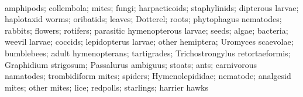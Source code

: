 \fullhline
\hline
{} \\
\hline
amphipods; collembola; mites; fungi; harpacticoids; staphylinids; dipterous larvae; haplotaxid worms; oribatids; leaves; Dotterel; roots; phytophagus nematodes; rabbits; flowers; rotifers; parasitic hymenopterous larvae; seeds; algae; bacteria; weevil larvae; coccids; lepidopterus larvae; other hemiptera; Uromyces scaevolae; bumblebees; adult hymenopterans; tartigrades; Trichostrongylus retortaeformis; Graphidium strigosum; Passalurus ambiguus; stoats; ants; carnivorous namatodes; trombidiform mites; spiders; Hymenolepididae; nematode; analgesid mites; other mites; lice; redpolls; starlings; harrier hawks\\
\fullhline